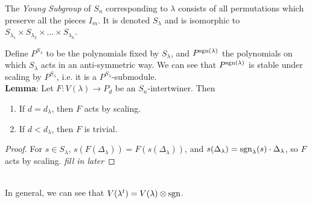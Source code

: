 \documentclass{amsart}
\begin{document}
The \textit{Young Subgroup} of $S_n$ corresponding to $\lambda$ consists of all permutations which preserve all the pieces $I_m$. It is denoted $S_{\lambda}$ and is isomorphic to $S_{\lambda_1}\times S_{\lambda_2} \times \dots \times S_{\lambda_k}$.

Define $P^{S_{\lambda}}$ to be the polynomials fixed by $S_{\lambda}$, and $P^{\operatorname{sgn}(\lambda)}$ the polynomials on which $S_{\lambda}$ acts in an anti-symmetric way. We can see that $P^{\operatorname{sgn}(\lambda)}$ is stable under scaling by $P^{S_{\lambda}}$, i.e. it is a $P^{S_{\lambda}}$-submodule.\\

\textbf{Lemma}: Let $F:V(\lambda)\to P_d$ be an $S_n$-intertwiner. Then
\begin{enumerate}
	\item If $d=d_{\lambda}$, then $F$ acts by scaling.
	\item If $d<d_{\lambda}$, then $F$ is trivial.
\end{enumerate}
\begin{proof}
	For $s\in S_{\lambda}$, $s(F(\Delta_{\lambda})) = F(s(\Delta_{\lambda}))$, and $s(\Delta_{\lambda}) = \operatorname{sgn}_{\lambda}(s)\cdot \Delta_{\lambda}$, so $F$ acts by scaling. \textit{fill in later}
\end{proof}\\

In general, we can see that $V(\lambda^t) = V(\lambda)\otimes \operatorname{sgn}$.
\end{document}
